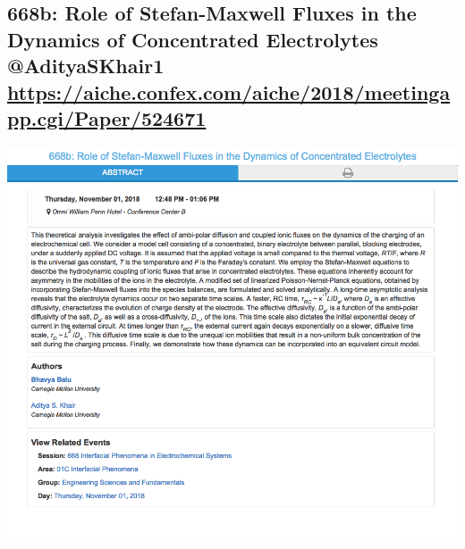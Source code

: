 \documentclass[11pt]{article}
\begin{document}
\subsection{668b: Role of Stefan-Maxwell Fluxes in the Dynamics of Concentrated Electrolytes @AdityaSKhair1 \url{https://aiche.confex.com/aiche/2018/meetingapp.cgi/Paper/524671}}
\label{sec:org648c10f}
\begin{center}
\includegraphics[width=.9\linewidth]{./524671.png}
\end{center}
\end{document}
